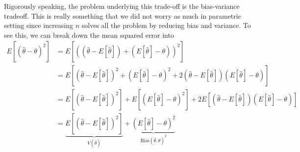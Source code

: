\documentclass[12pt]{article}
\theoremstyle{definition}
\theoremstyle{property}
\theoremstyle{assumption}
\theoremstyle{example}
\theoremstyle{comment}
\newtheorem{comment}{Comment}[section]
\begin{document}
 \begin{mdframed}[backgroundcolor=yellow!5]

\end{mdframed}
\par
Rigorously speaking, the problem underlying this trade-off is the bias-variance tradeoff. This is really something that we did not worry as much in parametric setting since increasing $n$ solves all the problem by reducing bias and variance. To see this, we can break down the mean squared error into 
\[
\begin{aligned}
E[(\hat{\theta}-\theta)^2]&=E[((\hat{\theta}-E[\hat{\theta}])+(E[\hat{\theta}]-\theta))^2]\\
&=E[(\hat{\theta}-E[\hat{\theta}])^2+(E[\hat{\theta}]-\theta)^2+2(\hat{\theta}-E[\hat{\theta}])(E[\hat{\theta}]-\theta)]\\
&=E[(\hat{\theta}-E[\hat{\theta}])^2]+E[(E[\hat{\theta}]-\theta)^2]+2E[(\hat{\theta}-E[\hat{\theta}])(E[\hat{\theta}]-\theta)]\\
&=\underbrace{E[(\hat{\theta}-E[\hat{\theta}])^2]}_{V(\hat{\theta})}+\underbrace{(E[\hat{\theta}]-\theta)^2}_{\text{Bias}(\hat{\theta},\theta)^2}
\end{aligned}
\]
\end{document}
